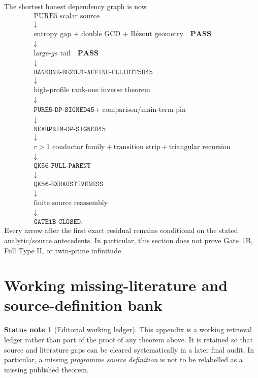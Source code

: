 \documentclass[11pt]{article}
\theoremstyle{definition}
\newtheorem{status}[status]{Status note}
\newcommand{\1}{\mathbf 1}
\begin{document}
The shortest honest dependency graph is now
\[
\boxed{
\begin{array}{c}
\text{PURE5 scalar source}\\
\downarrow\\
\text{entropy gap + double GCD + B\'ezout geometry}\quad\mathbf{PASS}\\
\downarrow\\
\text{large-}gs\text{ tail}\quad\mathbf{PASS}\\
\downarrow\\
\boxed{\texttt{RANKONE-BEZOUT-AFFINE-ELLIOTT5D45}}\\
\downarrow\\
\text{high-profile rank-one inverse theorem}\\
\downarrow\\
\texttt{PURE5-DP-SIGNED45}
+\text{ comparison/main-term pin}\\
\downarrow\\
\texttt{NEARPRIM-DP-SIGNED45}\\
\downarrow\\
r>1\text{ conductor family}+\text{transition strip}+\text{triangular recursion}\\
\downarrow\\
\texttt{QK56-FULL-PARENT}\\
\downarrow\\
\texttt{QK56-EXHAUSTIVENESS}\\
\downarrow\\
\text{finite source reassembly}\\
\downarrow\\
\texttt{GATE1B CLOSED}.
\end{array}}
\]
Every arrow after the first exact residual remains conditional on the stated
analytic/source antecedents.  In particular, this section does not prove
Gate~1B, Full Type II, or twin-prime infinitude.


\section{Working missing-literature and source-definition bank}
\label{app:missing-source-bank}

\begin{status}[Editorial working ledger]
This appendix is a working retrieval ledger rather than part of the proof of
any theorem above.  It is retained so that source and literature gaps can be
cleared systematically in a later final audit.  In particular, a missing
\emph{programme source definition} is not to be relabelled as a missing
published theorem.
\end{status}
\end{document}
